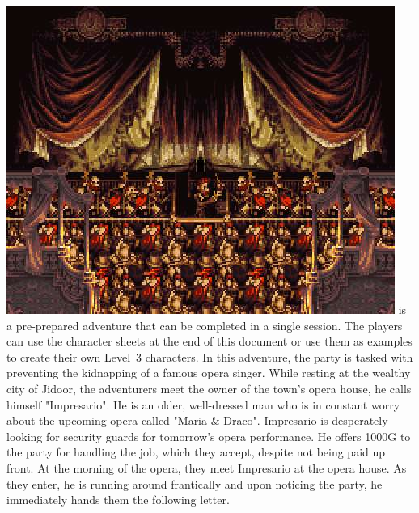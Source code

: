%
%
\vfill
%
\includegraphics[width=\columnwidth]{./art/mariaanddraco/opera.jpg}
%
\vfill
%
 is a pre-prepared adventure that can be completed in a single session.
The players can use the character sheets at the end of this document or use them as examples to create their own Level~3 characters. 
In this adventure, the party is tasked with preventing the kidnapping of a famous opera singer.
%
\vfill
%
%
\vfill
%
While resting at the wealthy city of Jidoor, the adventurers meet the owner of the town's opera house, he calls himself "Impresario".
He is an older, well-dressed man who is in constant worry about the upcoming opera called "Maria \& Draco".
Impresario is desperately looking for security guards for tomorrow's opera performance.
He offers 1000G to the party for handling the job, which they accept, despite not being paid up front.
At the morning of the opera, they meet Impresario at the opera house.
As they enter, he is running around frantically and upon noticing the party, he immediately hands them the following letter.\\\\
